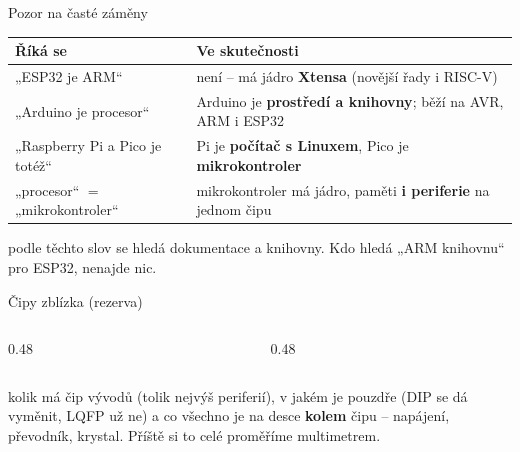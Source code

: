 \documentclass[12pt,aspectratio=169]{beamer}
\begin{document}
\begin{frame}{Pozor na časté záměny}
  \footnotesize
  \begin{tabular}{@{}p{4.4cm}p{6.4cm}@{}}
    \toprule
    Říká se & Ve skutečnosti \\
    \midrule
    „ESP32 je ARM`` & není -- má jádro \textbf{Xtensa} (novější řady i RISC-V) \\
    \addlinespace
    „Arduino je procesor`` & Arduino je \textbf{prostředí a knihovny};
      běží na AVR, ARM i ESP32 \\
    \addlinespace
    „Raspberry Pi a Pico je totéž`` & Pi je \textbf{počítač s Linuxem},
      Pico je \textbf{mikrokontroler} \\
    \addlinespace
    „procesor`` $=$ „mikrokontroler`` & mikrokontroler má jádro,
      paměti \textbf{i periferie} na jednom čipu \\
    \bottomrule
  \end{tabular}
  \vspace{3mm}

  \small
   podle těchto slov se hledá dokumentace a knihovny.
  Kdo hledá „ARM knihovnu`` pro ESP32, nenajde nic.
\end{frame}

\begin{frame}{Čipy zblízka \small (rezerva)}
  \begin{columns}[T]
    \begin{column}{0.48\textwidth}
    \end{column}
    \begin{column}{0.48\textwidth}
    \end{column}
  \end{columns}
  \vspace{1mm}
  \footnotesize
   kolik má čip vývodů (tolik nejvýš periferií),
  v jakém je pouzdře (DIP se dá vyměnit, LQFP už ne) a co všechno je na desce
  \textbf{kolem} čipu -- napájení, převodník, krystal. Příště si to celé
  proměříme multimetrem.
\end{frame}
\end{document}
